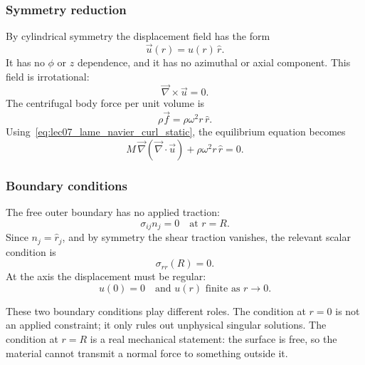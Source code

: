 \documentclass[../main.tex]{subfiles}
\begin{document}
\subsubsection*{Symmetry reduction}

By cylindrical symmetry the displacement field has the form
\begin{equation}
    \vec{u}(r)=u(r)\,\hat{r}.
    \label{eq:lec07_cylinder_displacement_ansatz}
\end{equation}
It has no $\phi$ or $z$ dependence, and it has no azimuthal or axial component. This field is irrotational:
\begin{equation}
    \vec{\nabla}\times\vec{u}=0.
    \label{eq:lec07_cylinder_curl_zero}
\end{equation}
The centrifugal body force per unit volume is
\begin{equation}
    \rho\vec{f}
    =\rho\omega^2 r\,\hat{r}.
    \label{eq:lec07_centrifugal_force}
\end{equation}
Using~\eqref{eq:lec07_lame_navier_curl_static}, the equilibrium equation becomes
\begin{equation}
    M\,\vec{\nabla}(\vec{\nabla}\cdot\vec{u})
    +\rho\omega^2 r\,\hat{r}=0.
    \label{eq:lec07_cylinder_equilibrium}
\end{equation}

\subsubsection*{Boundary conditions}

The free outer boundary has no applied traction:
\begin{equation}
    \sigma_{ij}n_j=0
    \quad\text{at }r=R.
    \label{eq:lec07_cylinder_free_surface_vector}
\end{equation}
Since $n_j=\hat{r}_j$, and by symmetry the shear traction vanishes, the relevant scalar condition is
\begin{equation}
    \sigma_{rr}(R)=0.
    \label{eq:lec07_cylinder_free_surface}
\end{equation}
At the axis the displacement must be regular:
\begin{equation}
    u(0)=0
    \quad\text{and }u(r)\text{ finite as }r\to0.
    \label{eq:lec07_cylinder_axis_regularity}
\end{equation}

These two boundary conditions play different roles. The condition at $r=0$ is not an applied constraint; it only rules out unphysical singular solutions. The condition at $r=R$ is a real mechanical statement: the surface is free, so the material cannot transmit a normal force to something outside it.
\end{document}
